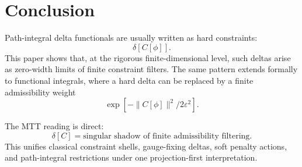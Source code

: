 \documentclass[11pt]{article}
\begin{document}
\section{Conclusion}

Path-integral delta functionals are usually written as hard constraints:
\[
\delta[C[\phi]].
\]
This paper shows that, at the rigorous finite-dimensional level, such deltas arise as
zero-width limits of finite constraint filters.  The same pattern extends formally to functional
integrals, where a hard delta can be replaced by a finite admissibility weight
\[
\exp[-\|C[\phi]\|^2/2\varepsilon^2].
\]

The MTT reading is direct:
\[
\boxed{
\delta[C]=\text{singular shadow of finite admissibility filtering}.
}
\]
This unifies classical constraint shells, gauge-fixing deltas, soft penalty actions, and
path-integral restrictions under one projection-first interpretation.
\end{document}
